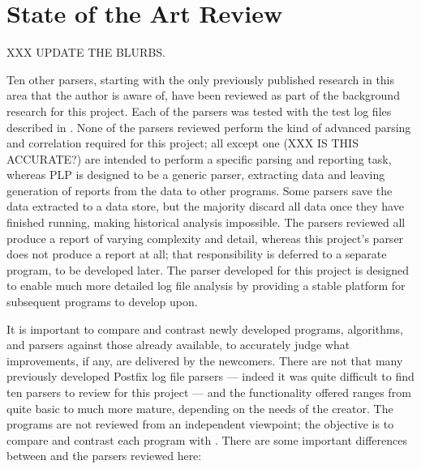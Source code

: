 \section{State of the Art Review}

\label{state of the art review}

XXX UPDATE THE BLURBS\@.

Ten other parsers, starting with the only previously published research in
this area that the author is aware of, have been reviewed as part of the
background research for this project.  Each of the parsers was tested with
the \numberOFlogFILES{} test log files described in .  None of the parsers reviewed perform the kind of advanced
parsing and correlation required for this project; all except one (XXX IS
THIS ACCURATE\@?) are intended to perform a specific parsing and reporting
task, whereas \gls{PLP} is designed to be a generic parser, extracting data
and leaving generation of reports from the data to other programs.  Some
parsers save the data extracted to a data store, but the majority discard
all data once they have finished running, making historical analysis
impossible.  The parsers reviewed all produce a report of varying
complexity and detail, whereas this project's parser does not produce a
report at all; that responsibility is deferred to a separate program, to be
developed later.  The parser developed for this project is designed to
enable much more detailed log file analysis by providing a stable platform
for subsequent programs to develop upon.

It is important to compare and contrast newly developed programs,
algorithms, and parsers against those already available, to accurately
judge what improvements, if any, are delivered by the newcomers.  There are
not that many previously developed Postfix log file parsers --- indeed it
was quite difficult to find ten parsers to review for this project --- and
the functionality offered ranges from quite basic to much more mature,
depending on the needs of the creator.  The programs are not reviewed from
an independent viewpoint; the objective is to compare and contrast each
program with \parsername{}.  There are some important differences between
\parsername{} and the parsers reviewed here:

